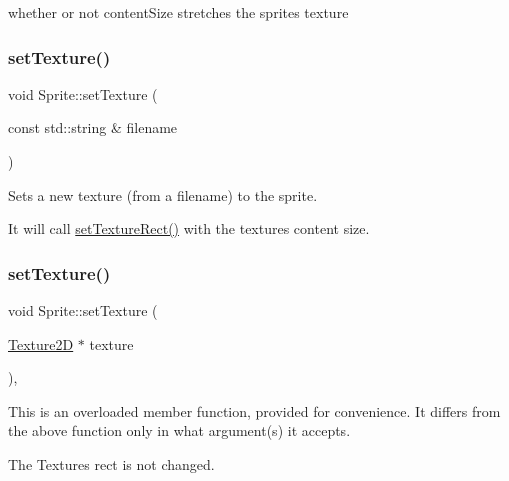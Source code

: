 whether or not content\+Size stretches the sprite\textquotesingle{}s texture \mbox{\label{classSprite_ae843f9c245dc48ce474099771f1cef06}} 
\subsubsection{\texorpdfstring{set\+Texture()}{setTexture()}\hspace{0.1cm}{\footnotesize\ttfamily [1/4]}}
{\footnotesize\ttfamily void Sprite\+::set\+Texture (\begin{DoxyParamCaption}\item[{const std\+::string \&}]{filename }\end{DoxyParamCaption})\hspace{0.3cm}{\ttfamily [virtual]}}

Sets a new texture (from a filename) to the sprite.

It will call {\ttfamily \hyperlink{classSprite_a3d342558db357e2bec2eb3368b41bd1f}{set\+Texture\+Rect()}} with the texture\textquotesingle{}s content size. \mbox{\label{classSprite_a535b1c82776fb585ab6e040cb8e10196}} 
\subsubsection{\texorpdfstring{set\+Texture()}{setTexture()}\hspace{0.1cm}{\footnotesize\ttfamily [2/4]}}
{\footnotesize\ttfamily void Sprite\+::set\+Texture (\begin{DoxyParamCaption}\item[{\hyperlink{classTexture2D}{Texture2D} $\ast$}]{texture }\end{DoxyParamCaption})\hspace{0.3cm}{\ttfamily [override]}, {\ttfamily [virtual]}}

This is an overloaded member function, provided for convenience. It differs from the above function only in what argument(s) it accepts.

The Texture\textquotesingle{}s rect is not changed. \mbox{\label{classSprite_a2d5e5b2268888fdd00887fed0944cac5}} 
